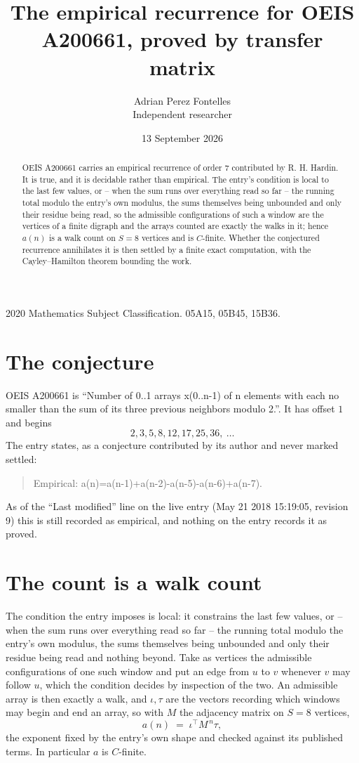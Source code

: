 \documentclass[11pt,a4paper]{article}
\title{The empirical recurrence for OEIS A200661, proved by transfer matrix}
\author{Adrian Perez Fontelles\\ \small Independent researcher}
\date{13 September 2026}
\theoremstyle{plain}
\theoremstyle{definition}
\begin{document}
\maketitle

\begin{abstract}
OEIS A200661 carries an empirical recurrence of order $7$ contributed by R. H. Hardin. It is
true, and it is decidable rather than empirical. The entry's condition is local to the last few values, or -- when the sum runs over everything read so far -- the running total modulo the entry's own modulus, the sums themselves being unbounded and only their residue being read, so
the admissible configurations of such a window are the vertices of a finite digraph and the
arrays counted are exactly the walks in it; hence $a(n)$ is a walk count on $S=8$ vertices
and is $C$-finite. Whether the conjectured recurrence annihilates it is then settled by a
finite exact computation, with the Cayley--Hamilton theorem bounding the work.
\end{abstract}

\noindent\small 2020 Mathematics Subject Classification. 05A15, 05B45, 15B36.\normalsize

\section{The conjecture}

OEIS A200661 is ``Number of 0..1 arrays x(0..n-1) of n elements with each no smaller than the sum of its three previous neighbors modulo 2.''. It has offset $1$ and begins
\[
2, 3, 5, 8, 12, 17, 25, 36,\ \dots
\]
The entry states, as a conjecture contributed by its author and never marked settled:
\begin{quote}
Empirical: a(n)=a(n-1)+a(n-2)-a(n-5)-a(n-6)+a(n-7).
\end{quote}
As of the ``Last modified'' line on the live entry (May 21 2018 15:19:05, revision 9) this is still
recorded as empirical, and nothing on the entry records it as proved.

\section{The count is a walk count}

The condition the entry imposes is local: it constrains the last few values, or -- when the sum runs over everything read so far -- the running total modulo the entry's own modulus, the sums themselves being unbounded and only their residue being read and nothing beyond. Take as vertices the admissible configurations of one such window and put an edge from $u$ to $v$ whenever $v$ may follow $u$, which the condition decides by inspection of the two.
An admissible array is then exactly a walk, and $\iota,\tau$ are the vectors recording which windows may begin and end an array, so with $M$ the adjacency matrix on $S=8$ vertices,
\[
a(n)\;=\;\iota^{\!\top}M^{\,n}\tau ,
\]
the exponent fixed by the entry's own shape and checked against its published terms. In
particular $a$ is $C$-finite.
\end{document}
